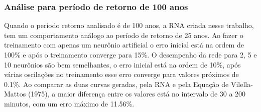 \subsubsection{Análise para período de retorno de 100 anos}
Quando o período retorno analisado é de 100 anos, a RNA criada nesse trabalho, tem um comportamento análogo ao período de retorno de 25 anos. Ao fazer o treinamento com apenas um neurônio artificial o erro inicial está na ordem de 100\% e após o treinamento converge para 15\%. O desempenho da rede para 2, 5 e 10 neurônios são bem semelhantes, o erro inicial está na ordem de 10\%, após várias oscilações no treinamento esse erro converge para valores próximos de 0.1\%. Ao comparar as duas curvas geradas, pela RNA e pela Equação de Vilella-Mattos (1975), a maior diferença entre os valores está no intervalo de 30 a 200 minutos, com um erro máximo de 11.56\%.
